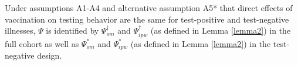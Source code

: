 \begin{appendix}

    

\begin{corollary}
    Under assumptions A1-A4 and alternative assumption A5* that direct effects of vaccination on testing behavior are the same for test-positive and test-negative illnesses, $\Psi$ is identified by $\Psi^\dagger_{om}$ and $\Psi^\dagger_{ipw}$ (as defined in Lemma \ref{lemma2}) in the full cohort as well as $\Psi^*_{om}$ and $\Psi^*_{ipw}$ (as defined in Lemma \ref{lemma2}) in the test-negative design.
\end{corollary}
    

\end{appendix}
